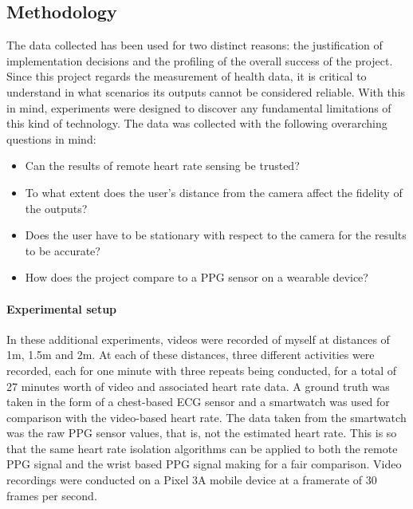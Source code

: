 \subsection{Methodology}
The data collected has been used for two distinct reasons: the justification of implementation decisions and the profiling of the overall success of the project.
Since this project regards the measurement of health data, it is critical to understand in what scenarios its outputs cannot be considered reliable.
With this in mind, experiments were designed to discover any fundamental limitations of this kind of technology. The data was collected with the following overarching questions in mind:
\begin{itemize}
    \item Can the results of remote heart rate sensing be trusted?
    \item To what extent does the user's distance from the camera affect the fidelity of the outputs?
    \item Does the user have to be stationary with respect to the camera for the results to be accurate?
    \item How does the project compare to a PPG sensor on a wearable device?
\end{itemize}


\paragraph{Experimental setup}
In these additional experiments, videos were recorded of myself at distances of 1m, 1.5m and 2m. 
At each of these distances, three different activities were recorded, each for one minute with three repeats being conducted, for a total of 27 minutes worth of video and associated heart rate data.
A ground truth was taken in the form of a chest-based ECG sensor and a smartwatch was used for comparison with the video-based heart rate.
The data taken from the smartwatch was the raw PPG sensor values, that is, not the estimated heart rate. This is so that the same heart rate isolation algorithms can be applied to both the 
remote PPG signal and the wrist based PPG signal making for a fair comparison.
Video recordings were conducted on a Pixel 3A mobile device at a framerate of 30 frames per second.

